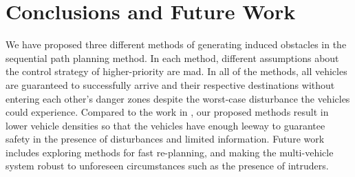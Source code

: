 \section{Conclusions and Future Work}
We have proposed three different methods of generating induced obstacles in the sequential path planning method. In each method, different assumptions about the control strategy of higher-priority are mad. In all of the methods, all vehicles are guaranteed to successfully arrive and their respective destinations without entering each other's danger zones despite the worst-case disturbance the vehicles could experience. Compared to the work in \cite{Chen15}, our proposed methods result in lower vehicle densities so that the vehicles have enough leeway to guarantee safety in the presence of disturbances and limited information. Future work includes exploring methods for fast re-planning, and making the multi-vehicle system robust to unforeseen circumstances such as the presence of intruders.